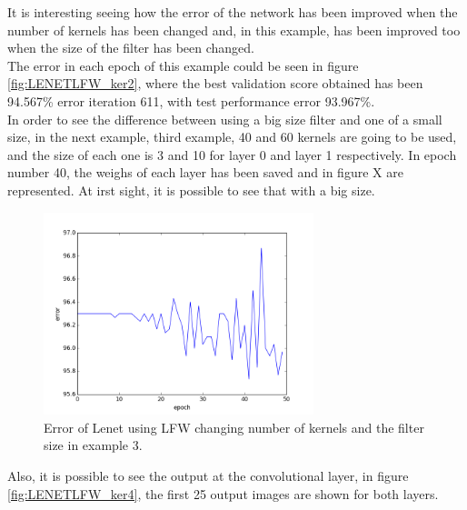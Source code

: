 It is interesting seeing how the error of the network has been improved when the number of kernels has been changed and, in this example, has been improved too when the size of the filter has been changed.\\

The error in each epoch of this example could be seen in figure \ref{fig:LENETLFW_ker2}, where the best validation score obtained has been 94.567\% error iteration 611, with test performance error 93.967\%.\\

In order to see the difference between using a big size filter and one of a small size, in the next example, third example, 40 and 60 kernels are going to be used, and the size of each one is 3 and 10 for layer 0 and layer 1 respectively. In epoch number 40, the weighs of each layer has been saved and in figure X are represented. At irst sight, it is possible to see that with a big size.\\

\begin{figure}[htb]
\centering
\includegraphics[width=0.7\textwidth]{images/LFW_layers/error_conv_40_60_3.png}
\caption{Error of Lenet using LFW changing number of kernels and the filter size in example 3.} \label{fig:LENETLFW_ker3}
\end{figure}

Also, it is possible to see the output at the convolutional layer, in figure \ref{fig:LENETLFW_ker4}, the first 25 output images are shown for both layers.\\

